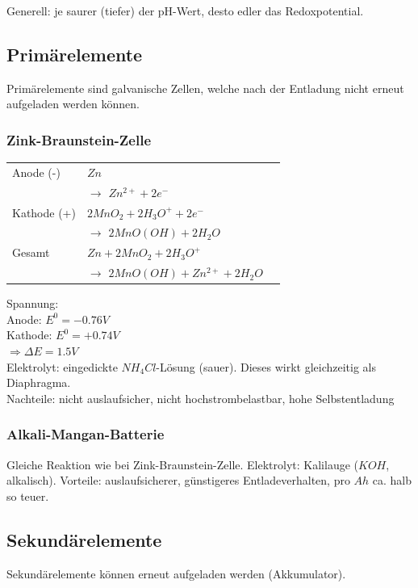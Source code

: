 Generell: je saurer (tiefer) der pH-Wert, desto edler das Redoxpotential. \\

\newpage

\subsection{Primärelemente}
Primärelemente sind galvanische Zellen, welche nach der Entladung nicht erneut aufgeladen werden können.

\subsubsection{Zink-Braunstein-Zelle}
\begin{table}[htbp]
	\begin{tabular}{lll}
	Anode (-) & $Zn$ \\ &\quad  $\rightarrow$ $Zn^{2+} + 2 e^-$ \\
	Kathode (+) & $2 MnO_2 + 2 H_3O^+ + 2e^-$ \\ &\quad $\rightarrow$ $2 MnO(OH) + 2 H_2O$  \\ \hline
	Gesamt & $Zn + 2 MnO_2 + 2 H_3O^+$ \\ &\quad $\rightarrow$ $2 MnO(OH) + Zn^{2+} + 2 H_2O$
	\end{tabular} 
\end{table}


Spannung: \\
Anode: $E^0 = -0.76V$ \\
Kathode: $E^0 = +0.74V$ \\
$\Rightarrow \Delta E = 1.5V$\\

Elektrolyt: eingedickte $NH_4Cl$-Lösung (sauer). Dieses wirkt gleichzeitig als Diaphragma.\\

Nachteile: nicht auslaufsicher, nicht hochstrombelastbar, hohe Selbstentladung \\

\subsubsection{Alkali-Mangan-Batterie}
Gleiche Reaktion wie bei Zink-Braunstein-Zelle. Elektrolyt: Kalilauge ($KOH
$, alkalisch). Vorteile: auslaufsicherer, günstigeres Entladeverhalten, pro $Ah$ ca. halb so teuer.

\subsection{Sekundärelemente}
Sekundärelemente können erneut aufgeladen werden (Akkumulator).


